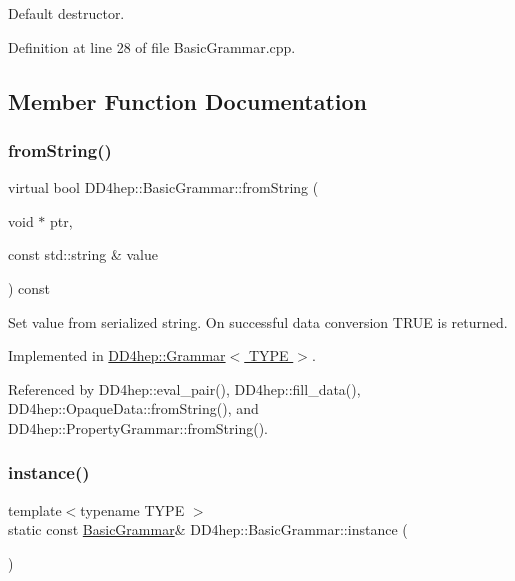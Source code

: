 Default destructor. 



Definition at line 28 of file Basic\+Grammar.\+cpp.



\subsection{Member Function Documentation}
\hypertarget{class_d_d4hep_1_1_basic_grammar_adf08fd5e01cf623c8b0e239bbe0b1868}{}\label{class_d_d4hep_1_1_basic_grammar_adf08fd5e01cf623c8b0e239bbe0b1868} 
\subsubsection{\texorpdfstring{from\+String()}{fromString()}}
{\footnotesize\ttfamily virtual bool D\+D4hep\+::\+Basic\+Grammar\+::from\+String (\begin{DoxyParamCaption}\item[{void $\ast$}]{ptr,  }\item[{const std\+::string \&}]{value }\end{DoxyParamCaption}) const\hspace{0.3cm}{\ttfamily [pure virtual]}}



Set value from serialized string. On successful data conversion T\+R\+UE is returned. 



Implemented in \hyperlink{class_d_d4hep_1_1_grammar_abf8d2ed7d9958d657a91ec69fa103df7}{D\+D4hep\+::\+Grammar$<$ T\+Y\+P\+E $>$}.



Referenced by D\+D4hep\+::eval\+\_\+pair(), D\+D4hep\+::fill\+\_\+data(), D\+D4hep\+::\+Opaque\+Data\+::from\+String(), and D\+D4hep\+::\+Property\+Grammar\+::from\+String().

\hypertarget{class_d_d4hep_1_1_basic_grammar_a2de5e8454bc247cc84e3137d3f2cb739}{}\label{class_d_d4hep_1_1_basic_grammar_a2de5e8454bc247cc84e3137d3f2cb739} 
\subsubsection{\texorpdfstring{instance()}{instance()}}
{\footnotesize\ttfamily template$<$typename T\+Y\+PE $>$ \\
static const \hyperlink{class_d_d4hep_1_1_basic_grammar}{Basic\+Grammar}\& D\+D4hep\+::\+Basic\+Grammar\+::instance (\begin{DoxyParamCaption}{ }\end{DoxyParamCaption})\hspace{0.3cm}{\ttfamily [static]}}



